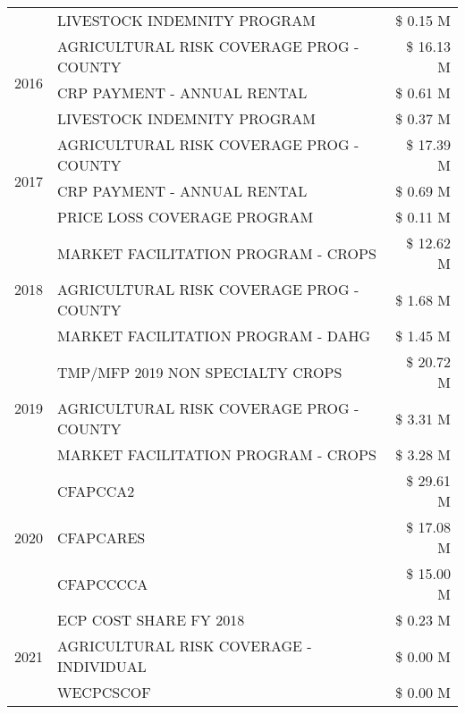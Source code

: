 \begin{tabular}{llr}
 & LIVESTOCK INDEMNITY PROGRAM & \$ 0.15 M \\
\cline{1-3}
\multirow[t]{3}{*}{2016} & AGRICULTURAL RISK COVERAGE PROG - COUNTY & \$ 16.13 M \\
 & CRP PAYMENT - ANNUAL RENTAL & \$ 0.61 M \\
 & LIVESTOCK INDEMNITY PROGRAM & \$ 0.37 M \\
\cline{1-3}
\multirow[t]{3}{*}{2017} & AGRICULTURAL RISK COVERAGE PROG - COUNTY & \$ 17.39 M \\
 & CRP PAYMENT - ANNUAL RENTAL & \$ 0.69 M \\
 & PRICE LOSS COVERAGE PROGRAM & \$ 0.11 M \\
\cline{1-3}
\multirow[t]{3}{*}{2018} & MARKET FACILITATION PROGRAM - CROPS & \$ 12.62 M \\
 & AGRICULTURAL RISK COVERAGE PROG - COUNTY & \$ 1.68 M \\
 & MARKET FACILITATION PROGRAM - DAHG & \$ 1.45 M \\
\cline{1-3}
\multirow[t]{3}{*}{2019} & TMP/MFP 2019 NON SPECIALTY CROPS & \$ 20.72 M \\
 & AGRICULTURAL RISK COVERAGE PROG - COUNTY & \$ 3.31 M \\
 & MARKET FACILITATION PROGRAM - CROPS & \$ 3.28 M \\
\cline{1-3}
\multirow[t]{3}{*}{2020} & CFAPCCA2 & \$ 29.61 M \\
 & CFAPCARES & \$ 17.08 M \\
 & CFAPCCCCA & \$ 15.00 M \\
\cline{1-3}
\multirow[t]{3}{*}{2021} & ECP COST SHARE FY 2018 & \$ 0.23 M \\
 & AGRICULTURAL RISK COVERAGE - INDIVIDUAL & \$ 0.00 M \\
 & WECPCSCOF & \$ 0.00 M \\
\cline{1-3}
\bottomrule
\end{tabular}
